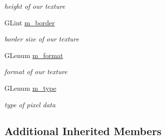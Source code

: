 \begin{DoxyCompactItemize}
\begin{DoxyCompactList}\small\item\em height of our texture \end{DoxyCompactList}\item 
\hypertarget{class_g_l_texture_a3a568e28bbc01e1adb7cf33f6889bce5}{G\-Lint \hyperlink{class_g_l_texture_a3a568e28bbc01e1adb7cf33f6889bce5}{m\-\_\-border}}\label{class_g_l_texture_a3a568e28bbc01e1adb7cf33f6889bce5}

\begin{DoxyCompactList}\small\item\em border size of our texture \end{DoxyCompactList}\item 
\hypertarget{class_g_l_texture_af2812d7eebea9c63a59e2994a745e8d0}{G\-Lenum \hyperlink{class_g_l_texture_af2812d7eebea9c63a59e2994a745e8d0}{m\-\_\-format}}\label{class_g_l_texture_af2812d7eebea9c63a59e2994a745e8d0}

\begin{DoxyCompactList}\small\item\em format of our texture \end{DoxyCompactList}\item 
\hypertarget{class_g_l_texture_a1f9a5c5d3ed73c2b2ad6be52967fd883}{G\-Lenum \hyperlink{class_g_l_texture_a1f9a5c5d3ed73c2b2ad6be52967fd883}{m\-\_\-type}}\label{class_g_l_texture_a1f9a5c5d3ed73c2b2ad6be52967fd883}

\begin{DoxyCompactList}\small\item\em type of pixel data \end{DoxyCompactList}\end{DoxyCompactItemize}
\subsection*{Additional Inherited Members}


